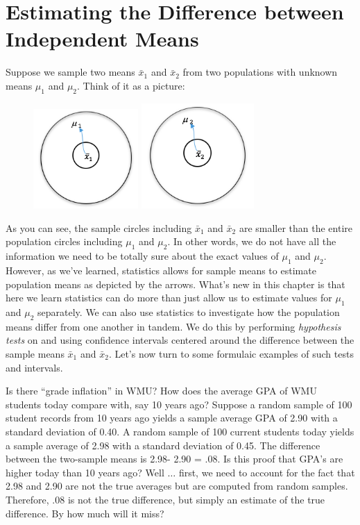 \documentclass[11pt, chapterprefix=true]{scrbook}\usepackage[]{graphicx}\usepackage[]{color}
\begin{document}
\section{Estimating the Difference between Independent Means}  

Suppose we sample two means $\bar{x}_1$ and $\bar{x}_2$  from two populations with unknown means $\mu_1$ and $\mu_2$. Think of it as a picture:

\begin{figure}[ht]
\centering
\includegraphics[width=4cm]{chapters/Chapter_11/ext_figure/x1.png} %
\includegraphics[width=4.3cm]{chapters/Chapter_11/ext_figure/x2.png} %
\end{figure}


As you can see, the sample circles including $\bar{x}_1$ and $\bar{x}_2$ are smaller than the entire population circles including $\mu_1$ and $\mu_2$. In other words, we do not have all the information we need to be totally sure about the exact values of  $\mu_1$ and $\mu_2$. However, as we've learned, statistics allows for sample means to estimate population means as depicted by the arrows. What's new in this chapter is that here we learn statistics can do more than just allow us to estimate values for $\mu_1$ and $\mu_2$ separately. We can also use statistics to investigate how the population means differ from one another in tandem. We do this by performing \textit{hypothesis tests} on and using confidence intervals centered around the difference between the sample means $\bar{x}_1$ and $\bar{x}_2$. Let's now turn to some formulaic examples of such tests and intervals.

Is there ``grade inflation'' in WMU?  How does the average GPA of WMU students today compare with, say 10 years ago?  Suppose a random sample of 100 student records from 10 years ago yields a sample average GPA of 2.90 with a standard deviation of 0.40.  A random sample of 100 current students today yields a sample average of 2.98 with a standard deviation of 0.45.  The difference between the two-sample means is 2.98- 2.90 = .08.  Is this proof that GPA's are higher today than 10 years ago?  Well $\dots$ first, we need to account for the fact that 2.98 and 2.90 are not the true averages but are computed from random samples.  Therefore, .08 is not the true difference, but simply an estimate of the true difference. By how much will it miss?
\end{document}
